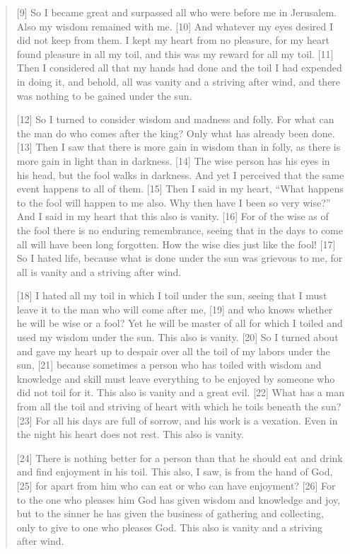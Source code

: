 \begin{quote}
    [9] So I became great and surpassed all who were before me in Jerusalem.
    Also my wisdom remained with me.  [10] And whatever my eyes desired I did
    not keep from them.  I kept my heart from no pleasure, for my heart found
    pleasure in all my toil, and this was my reward for all my toil.  [11]
    Then I considered all that my hands had done and the toil I had expended
    in doing it, and behold, all was vanity and a striving after wind, and
    there was nothing to be gained under the sun.

    [12] So I turned to consider wisdom and madness and folly.  For what can
    the man do who comes after the king?  Only what has already been done.
    [13] Then I saw that there is more gain in wisdom than in folly, as there
    is more gain in light than in darkness.  [14] The wise person has his
    eyes in his head, but the fool walks in darkness.  And yet I perceived
    that the same event happens to all of them.  [15] Then I said in my
    heart, “What happens to the fool will happen to me also.  Why then have I
    been so very wise?” And I said in my heart that this also is vanity.
    [16] For of the wise as of the fool there is no enduring remembrance,
    seeing that in the days to come all will have been long forgotten.  How
    the wise dies just like the fool!  [17] So I hated life, because what is
    done under the sun was grievous to me, for all is vanity and a striving
    after wind.

    [18] I hated all my toil in which I toil under the sun, seeing that I
    must leave it to the man who will come after me, [19] and who knows
    whether he will be wise or a fool?  Yet he will be master of all for
    which I toiled and used my wisdom under the sun.  This also is vanity.
    [20] So I turned about and gave my heart up to despair over all the toil
    of my labors under the sun, [21] because sometimes a person who has
    toiled with wisdom and knowledge and skill must leave everything to be
    enjoyed by someone who did not toil for it.  This also is vanity and a
    great evil.  [22] What has a man from all the toil and striving of heart
    with which he toils beneath the sun?  [23] For all his days are full of
    sorrow, and his work is a vexation.  Even in the night his heart does not
    rest.  This also is vanity.

    [24] There is nothing better for a person than that he should eat and
    drink and find enjoyment in his toil.  This also, I saw, is from the hand
    of God, [25] for apart from him who can eat or who can have enjoyment?
    [26] For to the one who pleases him God has given wisdom and knowledge
    and joy, but to the sinner he has given the business of gathering and
    collecting, only to give to one who pleases God.  This also is vanity and
    a striving after wind.
  \end{quote}
